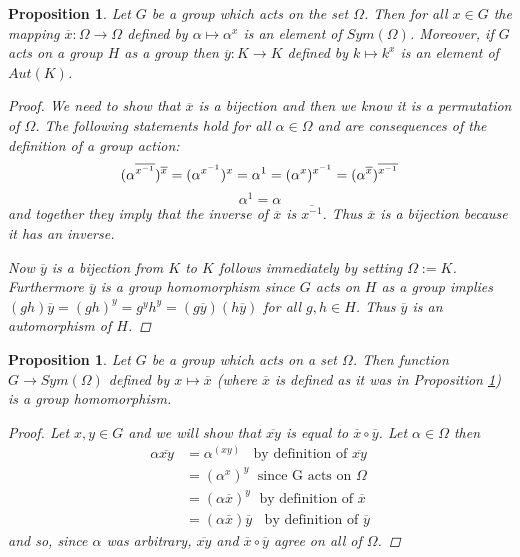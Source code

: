 \documentclass[]{article}
\newtheorem{prop}[thm]{Proposition}
\theoremstyle{definition}
\begin{document}
\begin{prop} \label{prop:overlineg}
Let $G$ be a group which acts on the set $\Omega$. Then for all $x \in G$ the mapping $\overline{x}: \Omega \rightarrow \Omega$ defined by $\alpha \mapsto \alpha^x$ is an element of $Sym(\Omega)$. Moreover, if $G$ acts on a group $H$ as a group then $\overline{y}:K \rightarrow K$ defined by $k \mapsto k^x$ is an element of $Aut(K)$.
\begin{proof}
We need to show that $\overline{x}$ is a bijection and then we know it is a permutation of $\Omega$. The following statements hold for all $\alpha \in \Omega$ and are consequences of the definition of a group action:
$$\vspace{-0.2cm} (\alpha^{\overline{x^{-1}}})^{\overline{x}} =(\alpha^{x^{-1}})^x = \alpha^{1} = (\alpha^x)^{x^{-1}} = (\alpha^{\overline{x}})^{\overline{x^{-1}}} $$
$$ \alpha^1 = \alpha$$
and together they imply that the inverse of $\overline{x}$ is $\overline{x^{-1}}$. Thus $\overline{x}$ is a bijection because it has an inverse.

Now $\overline{y}$ is a bijection from $K$ to $K$ follows immediately by setting $\Omega:=K$. Furthermore $\overline{y}$ is a group homomorphism since $G$ acts on $H$ as a group implies $(gh)\overline{y}=(gh)^y=g^yh^y=(g\overline{y})(h\overline{y})$ for all $g,h \in H$. Thus $\overline{y}$ is an automorphism of $H$.
\end{proof}
\end{prop}

\begin{prop} \label{prop:acttohom} 
Let $G$ be a group which acts on a set $\Omega$. Then function $G \rightarrow Sym(\Omega)$ defined by $x \mapsto \overline{x}$ (where $\overline{x}$ is defined as it was in Proposition \ref{prop:overlineg}) is a group homomorphism.
\begin{proof} Let $x,y \in G$ and we will show that $\overline{xy}$ is equal to $\overline{x} \circ \overline{y}$. Let $\alpha \in \Omega$ then
\begin{align*}
\alpha\overline{xy} & = \alpha^{(xy)} \; \; \mbox{ by definition of } \overline{xy} \\ 
& = (\alpha^x)^y \; \mbox{ since G acts on } \Omega \\
& = (\alpha \overline{x})^y \; \mbox{ by definition of } \overline{x} \\
& = (\alpha \overline{x}) \overline{y}  \; \; \mbox{ by definition of } \overline{y}
\end{align*}
and so, since $\alpha$ was arbitrary,  $\overline{xy}$ and $\overline{x} \circ \overline{y}$ agree on all of $\Omega$.
\end{proof} 
\end{prop}
\end{document}
